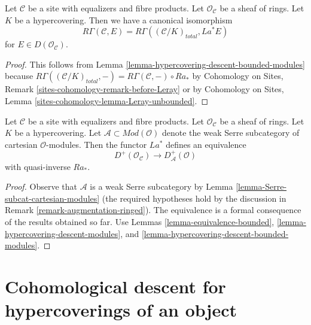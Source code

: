 \begin{lemma}
\label{lemma-compare-cohomology-hypercovering-modules}
Let $\mathcal{C}$ be a site with equalizers and fibre products.
Let $\mathcal{O}_\mathcal{C}$ be a sheaf of rings.
Let $K$ be a hypercovering.
Then we have a canonical isomorphism
$$
R\Gamma(\mathcal{C}, E) =
R\Gamma((\mathcal{C}/K)_{total}, La^*E)
$$
for $E \in D(\mathcal{O}_\mathcal{C})$.
\end{lemma}

\begin{proof}
This follows from Lemma \ref{lemma-hypercovering-descent-bounded-modules}
because $R\Gamma((\mathcal{C}/K)_{total}, -) =
R\Gamma(\mathcal{C}, -) \circ Ra_*$ by
Cohomology on Sites, Remark \ref{sites-cohomology-remark-before-Leray}
or by
Cohomology on Sites, Lemma \ref{sites-cohomology-lemma-Leray-unbounded}.
\end{proof}

\begin{lemma}
\label{lemma-hypercovering-equivalence-bounded-modules}
Let $\mathcal{C}$ be a site with equalizers and fibre products.
Let $\mathcal{O}_\mathcal{C}$ be a sheaf of rings.
Let $K$ be a hypercovering.
Let $\mathcal{A} \subset \textit{Mod}(\mathcal{O})$
denote the weak Serre subcategory of cartesian $\mathcal{O}$-modules.
Then the functor $La^*$ defines an equivalence
$$
D^+(\mathcal{O}_\mathcal{C}) \longrightarrow D_\mathcal{A}^+(\mathcal{O})
$$
with quasi-inverse $Ra_*$.
\end{lemma}

\begin{proof}
Observe that $\mathcal{A}$ is a weak Serre subcategory by
Lemma \ref{lemma-Serre-subcat-cartesian-modules}
(the required hypotheses hold by the discussion in
Remark \ref{remark-augmentation-ringed}).
The equivalence is a
formal consequence of the results obtained so far. Use
Lemmas \ref{lemma-equivalence-bounded},
\ref{lemma-hypercovering-descent-modules}, and
\ref{lemma-hypercovering-descent-bounded-modules}.
\end{proof}






\section{Cohomological descent for hypercoverings of an object}
\label{section-cohomological-descent-hypercoverings-X}

